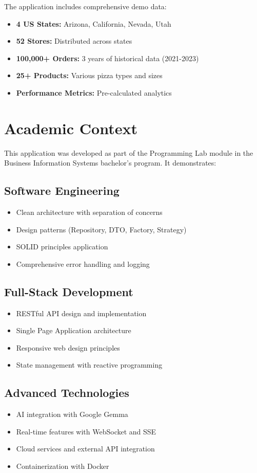 \documentclass[11pt,a4paper]{article}
\begin{document}
The application includes comprehensive demo data:
\begin{itemize}[leftmargin=*]
    \item \textbf{4 US States:} Arizona, California, Nevada, Utah
    \item \textbf{52 Stores:} Distributed across states
    \item \textbf{100,000+ Orders:} 3 years of historical data (2021-2023)
    \item \textbf{25+ Products:} Various pizza types and sizes
    \item \textbf{Performance Metrics:} Pre-calculated analytics
\end{itemize}

\section{Academic Context}

This application was developed as part of the Programming Lab module in the Business Information Systems bachelor's program. It demonstrates:

\subsection{Software Engineering}
\begin{itemize}[leftmargin=*]
    \item Clean architecture with separation of concerns
    \item Design patterns (Repository, DTO, Factory, Strategy)
    \item SOLID principles application
    \item Comprehensive error handling and logging
\end{itemize}

\subsection{Full-Stack Development}
\begin{itemize}[leftmargin=*]
    \item RESTful API design and implementation
    \item Single Page Application architecture
    \item Responsive web design principles
    \item State management with reactive programming
\end{itemize}

\subsection{Advanced Technologies}
\begin{itemize}[leftmargin=*]
    \item AI integration with Google Gemma
    \item Real-time features with WebSocket and SSE
    \item Cloud services and external API integration
    \item Containerization with Docker
\end{itemize}
\end{document}

